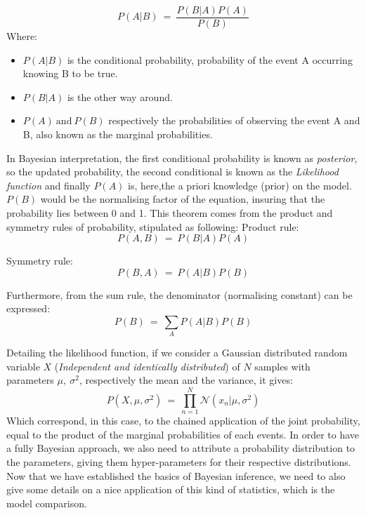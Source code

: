 \documentclass[twocolumn]{article}
\begin{document}
\begin{equation}
    P(A|B)\ =\ \frac{P(B|A)P(A)}{P(B)}
\end{equation}
Where:
\begin{itemize}
    \item $P(A|B)$ is the conditional probability, probability of the event A occurring knowing B to be true.
    \item $P(B|A)$ is the other way around.
    \item $P(A)\ \text{and}\ P(B)$ respectively the probabilities of observing the event A and B, also known as the marginal probabilities.
\end{itemize}
In Bayesian interpretation, the first conditional probability is known as \emph{posterior}, so the updated probability, the second conditional is known as the \emph{Likelihood function} and finally $P(A)$ is, here,the a priori knowledge (prior) on the model.
$P(B)$ would be the normalising factor of the equation, insuring that the probability lies between 0 and 1.
This theorem comes from the product and symmetry rules of probability, stipulated as following:
Product rule:\\
$$P(A,B)\ =\ P(B|A)P(A)$$


Symmetry rule:\\
$$P(B,A)\ =\ P(A|B)P(B)$$


Furthermore, from the sum rule, the denominator (normalising constant) can be expressed:\\
$$P(B)\ =\ \sum_AP(A|B)P(B)$$


Detailing the likelihood function, if we consider a Gaussian distributed random variable $X$ (\emph{Independent and identically distributed}) of $N$ samples with parameters $\mu,\ \sigma^2$, respectively the mean and the variance, it gives:
\begin{equation}
    P(X,\mu,\sigma^2)\ =\ \prod_{n=1}^N\mathcal{N}(x_n|\mu,\sigma^2)
    \label{equ:NormalLikelihood}
\end{equation}
Which correspond, in this case, to the chained application of the joint probability, equal to the product of the marginal probabilities of each events.
In order to have a fully Bayesian approach, we also need to attribute a probability distribution to the parameters, giving them hyper-parameters for their respective distributions.\\
Now that we have established the basics of Bayesian inference, we need to also give some details on a nice application of this kind of statistics, which is the model comparison.
\end{document}
